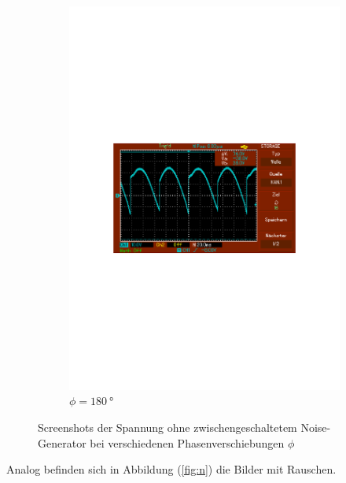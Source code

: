 \begin{figure}
\begin{subfigure}{0.3\textwidth}
      \includegraphics[width=\textwidth]{Daten/noNoise/180.pdf}
      \caption{$\phi = \SI{180}{\degree}$}
      \label{fig:180}
  \end{subfigure}
  \caption{Screenshots der Spannung ohne zwischengeschaltetem Noise-Generator bei verschiedenen Phasenverschiebungen $\phi$}
  \label{fig:1}
\end{figure}

\noindent
Analog befinden sich in Abbildung (\ref{fig:n}) die Bilder mit Rauschen.

